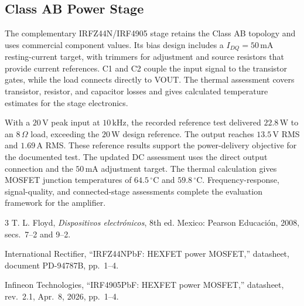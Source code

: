 \documentclass[conference,letterpaper]{IEEEtran}
\newcommand{\Ohm}{\Omega}
\newcommand{\V}{\mathrm{V}}
\newcommand{\A}{\mathrm{A}}
\newcommand{\W}{\mathrm{W}}
\newcommand{\kHz}{\mathrm{kHz}}
\begin{document}
\subsection{Class AB Power Stage}

The complementary IRFZ44N/IRF4905 stage retains the Class AB topology
and uses commercial component values. Its bias design includes a
$I_{DQ}=50\,\mathrm{mA}$ resting-current target, with trimmers for
adjustment and source resistors that provide current references.
C1 and C2 couple the input signal to the transistor gates, while
the load connects directly to VOUT. The thermal assessment covers
transistor, resistor, and capacitor losses and gives calculated
temperature estimates for the stage electronics.

With a $20\,\V$ peak input at $10\,\kHz$, the recorded reference test delivered
$22.8\,\W$ to an $8\,\Ohm$ load, exceeding the $20\,\W$ design
reference. The output reaches $13.5\,\V$ RMS and $1.69\,\A$ RMS.
These reference results support the power-delivery objective for
the documented test. The updated DC assessment uses the direct
output connection and the $50\,\mathrm{mA}$ adjustment target. The thermal calculation gives MOSFET junction temperatures of
$64.5\,{}^\circ\mathrm{C}$ and $59.8\,{}^\circ\mathrm{C}$.
Frequency-response, signal-quality, and connected-stage assessments
complete the evaluation framework for the amplifier.

\begin{thebibliography}{3}
T. L. Floyd, \emph{Dispositivos electrónicos}, 8th ed.
Mexico: Pearson Educación, 2008, secs.~7--2 and 9--2.

International Rectifier, ``IRFZ44NPbF: HEXFET power MOSFET,''
datasheet, document PD-94787B, pp.~1--4.

Infineon Technologies, ``IRF4905PbF: HEXFET power MOSFET,''
datasheet, rev.~2.1, Apr.~8, 2026, pp.~1--4.
\end{thebibliography}
\end{document}
